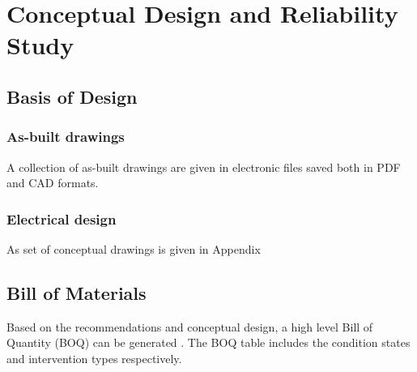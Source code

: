 \chapter{Conceptual Design and Reliability Study} %
\label{Chapter6}
%
\section{Basis of Design}
\subsection{As-built drawings}
A collection of as-built drawings are given in electronic files saved both in PDF and CAD formats.
\subsection{Electrical design}
As set of conceptual drawings is given in Appendix %

%
\section{Bill of Materials}
Based on the recommendations and conceptual design, a high level Bill of Quantity (BOQ) can be generated . The BOQ table includes the condition states and intervention types respectively. %



